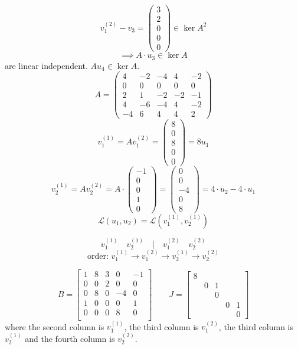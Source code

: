 \documentclass[a4paper]{article}
\theoremstyle{definition}
\begin{document}
\begin{enumerate}
    \[ v_1^{(2)} - v_3 = \begin{pmatrix} 3 \\ 2 \\ 0 \\ 0 \\ 0 \end{pmatrix} \in \ker{A^2} \]
    \[ \implies A \cdot u_3 \in \ker{A} \]
    are linear independent. $A u_4 \in \ker{A}$.
    \[
      A = \begin{pmatrix}
        4 & -2 & -4 & 4 & -2 \\
        0 & 0 & 0 & 0 & 0 \\
        2 & 1 & -2 & -2 & -1 \\
        4 & -6 & -4 & 4 & -2 \\
        -4 & 6 & 4 & 4 & 2
      \end{pmatrix}
    \]
    \[ v_1^{(1)} = A v_1^{(2)} = \begin{pmatrix} 8 \\ 0 \\ 8 \\ 0 \\ 0 \end{pmatrix} = 8 u_1 \]
    \[ v_2^{(1)} = A v_2^{(2)} = A \cdot \begin{pmatrix} -1 \\ 0 \\ 0 \\ 1 \\ 0 \end{pmatrix} = \begin{pmatrix} 0 \\ 0 \\ -4 \\ 0 \\ 8 \end{pmatrix} = 4 \cdot u_2 - 4 \cdot u_1 \]
    \[ \mathcal L(u_1, u_2) = \mathcal L(v_1^{(1)}, v_2^{(1)}) \]

    \[ v_1^{(1)} \quad v_2^{(1)} \quad | \quad v_1^{(2)} \quad v_2^{(2)} \]
    \[ \text{order: } v_1^{(1)} \to v_1^{(2)} \to v_2^{(1)} \to v_2^{(2)} \]

    \[
      B = \begin{bmatrix}
        1 & 8 & 3 & 0 & -1 \\
        0 & 0 & 2 & 0 & 0 \\
        0 & 8 & 0 & -4 & 0 \\
        1 & 0 & 0 & 0 & 1 \\
        0 & 0 & 0 & 8 & 0 \\
      \end{bmatrix}
      \qquad
      J = \begin{bmatrix}
        8 &   &   &   & \\
          & 0 & 1 &   & \\
          &   & 0 &   & \\
          &   &   & 0 & 1 \\
          &   &   &   & 0
      \end{bmatrix}
    \]
    where the second column is $v_1^{(1)}$, the third column is $v_1^{(2)}$, the third column is $v_2^{(1)}$ and the fourth column is $v_2^{(2)}$.
\end{enumerate}
\end{document}

